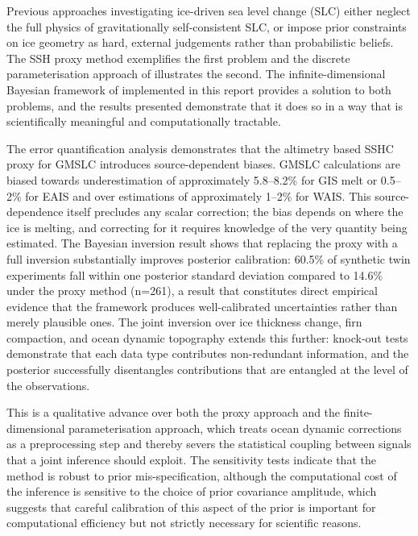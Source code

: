 Previous approaches investigating ice-driven sea level change (SLC) either neglect the full physics of gravitationally self-consistent SLC, or impose prior constraints on ice geometry as hard, external judgements rather than probabilistic beliefs. The SSH proxy method exemplifies the first problem and the discrete parameterisation approach of \textcite{coulsonInvertingSeaSurface2026} illustrates the second. The infinite-dimensional Bayesian framework of \textcite{heathcoteScaleableBayesianFramework2026} implemented in this report provides a solution to both problems, and the results presented demonstrate that it does so in a way that is scientifically meaningful and computationally tractable.

The error quantification analysis demonstrates that the altimetry based SSHC proxy for GMSLC introduces source-dependent biases. GMSLC calculations are biased towards underestimation of approximately 5.8--8.2\% for GIS melt or 0.5--2\% for EAIS and over estimations of approximately 1--2\% for WAIS. This source-dependence itself precludes any scalar correction; the bias depends on where the ice is melting, and correcting for it requires knowledge of the very quantity being estimated. The Bayesian inversion result shows that replacing the proxy with a full inversion substantially improves posterior calibration: 60.5\% of synthetic twin experiments fall within one posterior standard deviation compared to 14.6\% under the proxy method (n=261), a result that constitutes direct empirical evidence that the framework produces well-calibrated uncertainties rather than merely plausible ones. The joint inversion over ice thickness change, firn compaction, and ocean dynamic topography extends this further: knock-out tests demonstrate that each data type contributes non-redundant information, and the posterior successfully disentangles contributions that are entangled at the level of the observations.

This is a qualitative advance over both the proxy approach and the finite-dimensional parameterisation approach, which treats ocean dynamic corrections as a preprocessing step and thereby severs the statistical coupling between signals that a joint inference should exploit. The sensitivity tests indicate that the method is robust to prior mis-specification, although the computational cost of the inference is sensitive to the choice of prior covariance amplitude, which suggests that careful calibration of this aspect of the prior is important for computational efficiency but not strictly necessary for scientific reasons.


